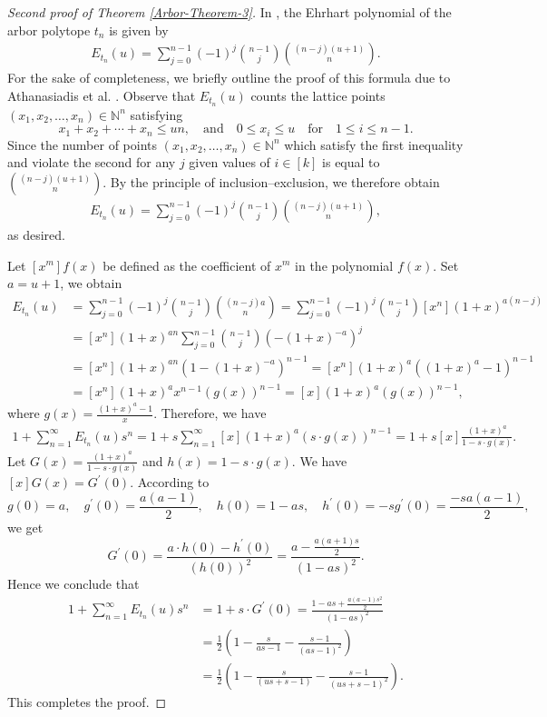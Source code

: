 \documentclass[reqno, 12pt]{article}
\theoremstyle{mydefinition}
\theoremstyle{myremark}
\begin{document}
\begin{proof}[Second proof of Theorem \ref{Arbor-Theorem-3}]
In \cite{Athanasiadis-Xiao-Yan}, the Ehrhart polynomial of the arbor polytope $t_n$ is given by
\begin{align*}
E_{t_n}(u)=\sum_{j=0}^{n-1}(-1)^j \binom{n-1}{j} \binom{(n-j)(u+1)}{n}.
\end{align*}
For the sake of completeness, we briefly outline the proof of this formula due to Athanasiadis et al. \cite{Athanasiadis-Xiao-Yan}.
Observe that $E_{t_n}(u)$ counts the lattice points $(x_1,x_2,\ldots,x_n)\in \mathbb{N}^n$ satisfying
$$x_1+x_2+\cdots +x_n\leq un, \quad\text{and}\quad 0\leq x_i\leq u \quad \text{for} \quad 1\leq i\leq n-1.$$
Since the number of points $(x_1,x_2,\ldots,x_n)\in \mathbb{N}^n$ which satisfy the first inequality and violate the second for any $j$ given values of $i\in [k]$ is equal to $\binom{(n-j)(u+1)}{n}$.
By the principle of inclusion–exclusion, we therefore obtain
\begin{align*}
E_{t_n}(u)=\sum_{j=0}^{n-1}(-1)^j \binom{n-1}{j} \binom{(n-j)(u+1)}{n},
\end{align*}
as desired.

Let $[x^m]f(x)$ be defined as the coefficient of $x^m$ in the polynomial $f(x)$.
Set $a=u+1$, we obtain
\begin{align*}
E_{t_n}(u)&=\sum_{j=0}^{n-1}(-1)^j \binom{n-1}{j} \binom{(n-j)a}{n}=\sum_{j=0}^{n-1}(-1)^j\binom{n-1}{j} [x^n] (1+x)^{a(n-j)}
\\ &=[x^n] (1+x)^{an} \sum_{j=0}^{n-1}\binom{n-1}{j}(-(1+x)^{-a})^j
\\ &=[x^n] (1+x)^{an}(1-(1+x)^{-a})^{n-1}=[x^n] (1+x)^a ((1+x)^a-1)^{n-1}
\\ &=[x^n] (1+x)^a x^{n-1} (g(x))^{n-1}=[x] (1+x)^a (g(x))^{n-1},
\end{align*}
where $g(x)=\frac{(1+x)^a-1}{x}$. Therefore, we have
\begin{align*}
1+\sum_{n=1}^{\infty} E_{t_n}(u) s^n=1+s \sum_{n=1}^\infty [x] (1+x)^a (s\cdot g(x))^{n-1}=1+s[x]\frac{(1+x)^a}{1-s\cdot g(x)}.
\end{align*}
Let $G(x)=\frac{(1+x)^a}{1-s\cdot g(x)}$ and $h(x)=1-s\cdot g(x)$. We have $[x]G(x)=G^{\prime}(0)$.
According to 
$$g(0)=a,\quad g^{\prime}(0)=\frac{a(a-1)}{2},\quad h(0)=1-as,\quad h^{\prime}(0)=-sg^{\prime}(0)=\frac{-sa(a-1)}{2},$$
we get
$$G^{\prime}(0)=\frac{a\cdot h(0)-h^{\prime}(0)}{(h(0))^2}=\frac{a-\frac{a(a+1)s}{2}}{(1-as)^2}.$$
Hence we conclude that
\begin{align*}
1+\sum_{n=1}^{\infty} E_{t_n}(u) s^n &=1+s\cdot G^{\prime}(0)=\frac{1-as+\frac{a(a-1)s^2}{2}}{(1-as)^2}
\\ &= \frac{1}{2}\left( 1-\frac{s}{as-1}-\frac{s-1}{(as-1)^2}\right)
\\ & =\frac{1}{2} \left( 1 - \frac{s}{(us + s - 1)} - \frac{s - 1}{(us + s - 1)^2} \right).
\end{align*}
This completes the proof.
\end{proof}
\end{document}
